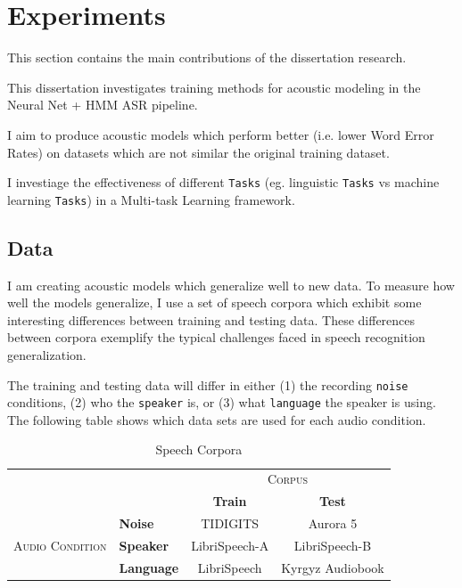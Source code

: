 \documentclass[10pt,a4paper]{article}
\begin{document}
\newpage

\section{Experiments}

This section contains the main contributions of the dissertation research.

This dissertation investigates training methods for acoustic modeling in the Neural Net + HMM ASR pipeline.

I aim to produce acoustic models which perform better (i.e. lower Word Error Rates) on datasets which are not similar the original training dataset.

I investiage the effectiveness of different \texttt{Tasks} (eg. linguistic \texttt{Tasks} vs machine learning \texttt{Tasks}) in a Multi-task Learning framework.


\subsection{Data}

I am creating acoustic models which generalize well to new data. To measure how well the models generalize, I use a set of speech corpora which exhibit some interesting differences between training and testing data. These differences between corpora exemplify the typical challenges faced in speech recognition generalization.

The training and testing data will differ in either (1) the recording \texttt{noise} conditions, (2) who the \texttt{speaker} is, or (3) what \texttt{language} the speaker is using. The following table shows which data sets are used for each audio condition.


\begin{table}[!htbp]
  \centering
  \begin{adjustbox}{width=.75\textwidth}
    \begin{tabular}{clcc}
      \toprule
      && \multicolumn{2}{c}{\textsc{Corpus}}\\
      && \textbf{Train} & \textbf{Test}\\
      \midrule
      \multirow{3}{*}{\textsc{Audio Condition}} &\textbf{Noise} & TIDIGITS & Aurora 5 \\
      &\textbf{Speaker} & LibriSpeech-A & LibriSpeech-B \\
      &\textbf{Language} & LibriSpeech & Kyrgyz Audiobook \\
      \bottomrule
    \end{tabular}
    \label{table:data}
  \end{adjustbox}
  
  \caption{Speech Corpora}
  
\end{table}
\end{document}

